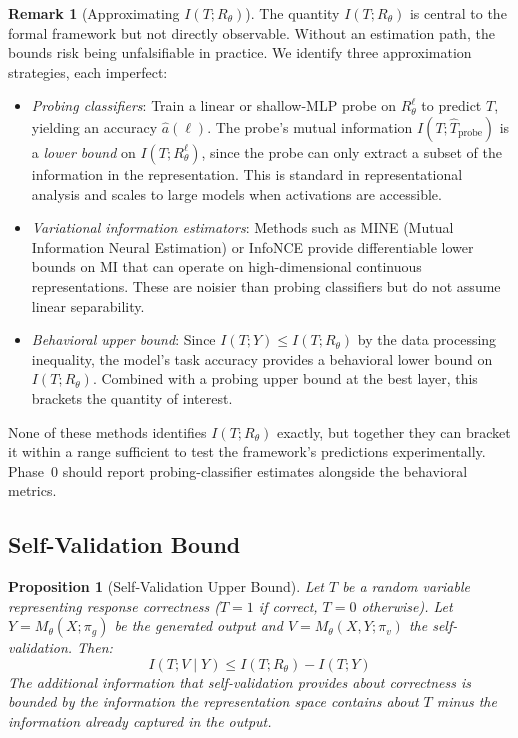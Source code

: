 \documentclass[11pt,a4paper]{article}
\newtheorem{proposition}{Proposition}[section]
\theoremstyle{definition}
\newtheorem{remark}{Remark}[section]
\newcommand{\Rtheta}{R_\theta}
\begin{document}
\begin{remark}[Approximating $I(T; \Rtheta)$]
\label{rem:estimation}
The quantity $I(T; \Rtheta)$ is central to the formal framework but not directly observable. Without an estimation path, the bounds risk being unfalsifiable in practice. We identify three approximation strategies, each imperfect:
\begin{itemize}[leftmargin=*,itemsep=2pt]
\item \emph{Probing classifiers}: Train a linear or shallow-MLP probe on $R_\theta^\ell$ to predict $T$, yielding an accuracy $\hat{a}(\ell)$. The probe's mutual information $I(T; \hat{T}_\text{probe})$ is a \emph{lower bound} on $I(T; R_\theta^\ell)$, since the probe can only extract a subset of the information in the representation. This is standard in representational analysis and scales to large models when activations are accessible.
\item \emph{Variational information estimators}: Methods such as MINE (Mutual Information Neural Estimation) or InfoNCE provide differentiable lower bounds on MI that can operate on high-dimensional continuous representations. These are noisier than probing classifiers but do not assume linear separability.
\item \emph{Behavioral upper bound}: Since $I(T; Y) \leq I(T; \Rtheta)$ by the data processing inequality, the model's task accuracy provides a behavioral lower bound on $I(T; \Rtheta)$. Combined with a probing upper bound at the best layer, this brackets the quantity of interest.
\end{itemize}
None of these methods identifies $I(T; \Rtheta)$ exactly, but together they can bracket it within a range sufficient to test the framework's predictions experimentally. Phase~0 should report probing-classifier estimates alongside the behavioral metrics.
\end{remark}

\subsection{Self-Validation Bound}

\begin{proposition}[Self-Validation Upper Bound]
\label{prop:svbound}
Let $T$ be a random variable representing response correctness ($T=1$ if correct, $T=0$ otherwise). Let $Y = M_\theta(X; \pi_g)$ be the generated output and $V = M_\theta(X, Y; \pi_v)$ the self-validation. Then:
\begin{equation}
I(T; V \mid Y) \leq I(T; \Rtheta) - I(T; Y)
\end{equation}
The additional information that self-validation provides about correctness is bounded by the information the representation space contains about $T$ minus the information already captured in the output.
\end{proposition}
\end{document}
